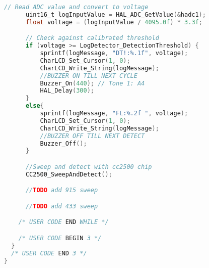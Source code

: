 \documentclass[12pt]{article}
\begin{document}
\begin{lstlisting}[language=C]
	  // Read ADC value and convert to voltage
	  uint16_t logInputValue = HAL_ADC_GetValue(&hadc1);
	  float voltage = (logInputValue / 4095.0f) * 3.3f;

	  // Check against calibrated threshold
	  if (voltage >= LogDetector_DetectionThreshold) {
	      sprintf(logMessage, "DT!:%.1f", voltage);
	      CharLCD_Set_Cursor(1, 0);
	      CharLCD_Write_String(logMessage);
	      //BUZZER ON TILL NEXT CYCLE
	      Buzzer_On(440); // Tone 1: A4
	      HAL_Delay(300);
	  }
	  else{
	      sprintf(logMessage, "FL:%.2f ", voltage);
	      CharLCD_Set_Cursor(1, 0);
	      CharLCD_Write_String(logMessage);
	      //BUZZER OFF TILL NEXT DETECT
	      Buzzer_Off();
	  }

	  //Sweep and detect with cc2500 chip
	  CC2500_SweepAndDetect();

	  //TODO add 915 sweep

	  //TODO add 433 sweep

    /* USER CODE END WHILE */

    /* USER CODE BEGIN 3 */
  }
  /* USER CODE END 3 */
}

\end{lstlisting}
\end{document}
